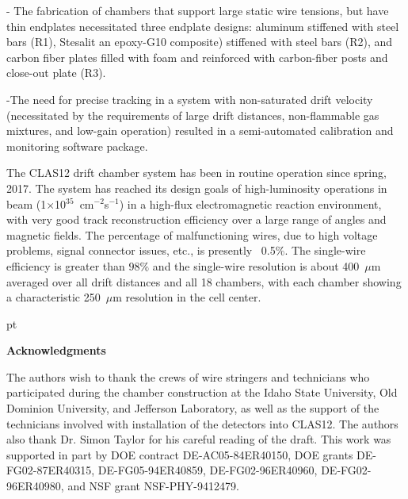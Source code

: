 \noindent
- The fabrication of chambers that support large static wire tensions, but have thin 
endplates necessitated three endplate designs: aluminum stiffened with steel bars (R1),
Stesalit an epoxy-G10 composite) stiffened with steel bars (R2), and carbon fiber plates filled with foam and reinforced
with carbon-fiber posts and close-out plate (R3). 

\noindent
-The need for precise tracking in a system with non-saturated drift velocity 
(necessitated by the requirements of large drift distances, non-flammable gas mixtures, 
and low-gain operation) resulted in a semi-automated calibration and monitoring software 
package.

\vskip 10pt
The CLAS12 drift chamber system has been in routine operation since spring, 2017. 
The system has reached its design goals of high-luminosity operations in beam
(1$\times$10$^{35}$~cm$^{-2}$s$^{-1}$) in a high-flux electromagnetic reaction
environment, with very good track reconstruction efficiency over a large range of angles and 
magnetic fields.  
The percentage of malfunctioning wires, due to high voltage problems, signal
connector issues, etc., is presently ~0.5\%.
The single-wire efficiency is greater than $98\%$ and the
single-wire resolution is about 400~$\mu$m averaged over all drift distances and
all 18 chambers, with each chamber showing a characteristic 250~$\mu$m resolution 
in the cell center.

 pt

{\large{\bf Acknowledgments}}

\vskip 10pt

The authors wish to thank the crews of wire stringers and technicians who 
participated during the chamber construction at the Idaho State University,
Old Dominion University, and Jefferson Laboratory, as well as the support of 
the technicians involved with installation of the detectors into CLAS12.  The
authors also thank Dr. Simon Taylor for his careful reading of the draft.  This
work was supported in part by DOE contract DE-AC05-84ER40150, DOE grants 
DE-FG02-87ER40315, DE-FG05-94ER40859, DE-FG02-96ER40960, DE-FG02-96ER40980, 
and NSF grant NSF-PHY-9412479.




